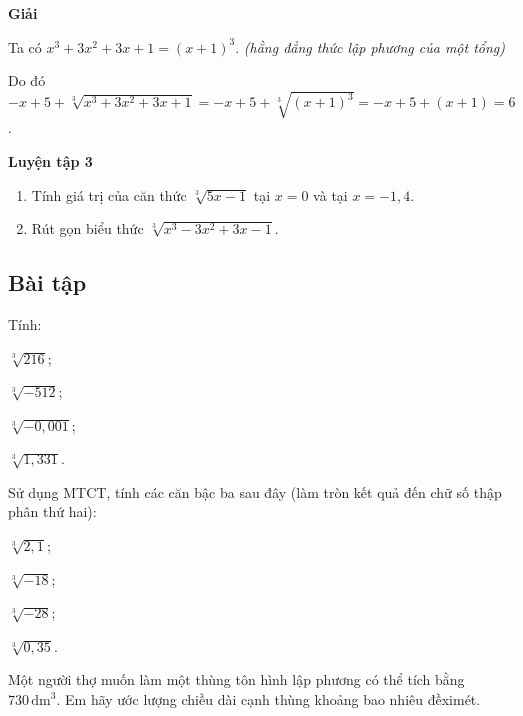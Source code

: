 \begin{lesson}
    \textbf{Giải}

    Ta có $x^3+3x^2+3x+1=(x+1)^3$. \textit{(hằng đẳng thức lập phương của một tổng)}

    Do đó $-x+5+\sqrt[3]{x^3+3x^2+3x+1}=-x+5+\sqrt[3]{(x+1)^3}=-x+5+(x+1)=6$.

    \textbf{Luyện tập 3}
    \begin{enumerate}[label=\alph*)]
        \item Tính giá trị của căn thức $\sqrt[3]{5x-1}$ tại $x=0$ và tại $x=-1,4$.
        \item Rút gọn biểu thức $\sqrt[3]{x^3-3x^2+3x-1}$.
    \end{enumerate}

    \answerline
    \answerline
\end{lesson}

\begin{exercises}
    \subsection{Bài tập}

    \begin{questions}[resume=SGK]
        \item Tính:
        \begin{questions}
            \item $\sqrt[3]{216}$;
            \item $\sqrt[3]{-512}$;
            \item $\sqrt[3]{-0,001}$;
            \item $\sqrt[3]{1,331}$.
        \end{questions}
        \answerline
        \answerline

        \item Sử dụng MTCT, tính các căn bậc ba sau đây (làm tròn kết quả đến chữ số thập phân thứ hai):
        \begin{questions}
            \item $\sqrt[3]{2,1}$;
            \item $\sqrt[3]{-18}$;
            \item $\sqrt[3]{-28}$;
            \item $\sqrt[3]{0,35}$.
        \end{questions}
        \answerline
        \answerline

        \item Một người thợ muốn làm một thùng tôn hình lập phương có thể tích bằng $730\,\text{dm}^3$. Em hãy ước lượng chiều dài cạnh thùng khoảng bao nhiêu đềximét.
        \answerline
        \answerline


\end{questions}
\end{exercises}
